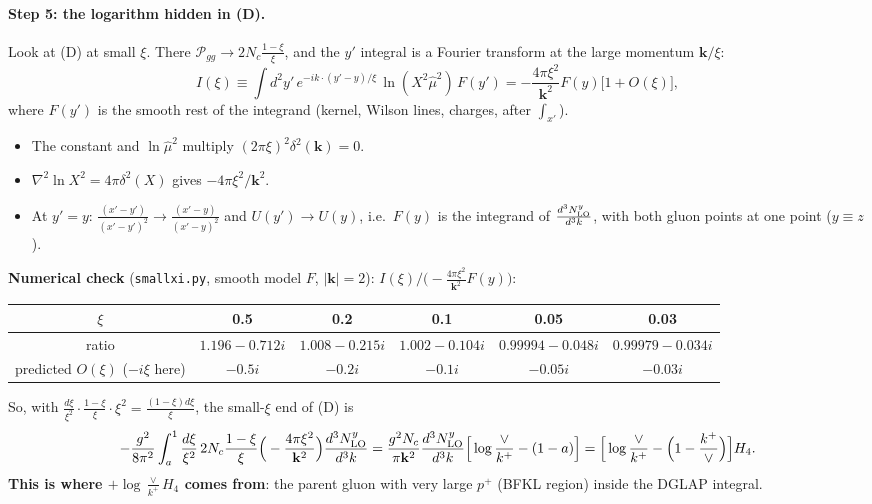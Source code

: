 \documentclass[10pt]{article}
\numberwithin{equation}{section}
\begin{document}
\paragraph{Step 5: the logarithm hidden in (D).}\label{sec:small} Look at (D) at small $\xi$. There $\mathcal P_{gg}\to2N_c\frac{1-\xi}{\xi}$, and the $y'$ integral is a Fourier transform at the large momentum $\mathbf k/\xi$:
\begin{equation}
I(\xi)\equiv\int d^2y'\,e^{-ik\cdot(y'-y)/\xi}\,\ln(X^2\hat\mu^2)\,F(y')=-\frac{4\pi\xi^2}{\mathbf k^2}F(y)\Big[1+O(\xi)\Big],\label{eq:I}
\end{equation}
where $F(y')$ is the smooth rest of the integrand (kernel, Wilson lines, charges, after $\int_{x'}$).
\begin{itemize}
\item The constant and $\ln\hat\mu^2$ multiply $(2\pi\xi)^2\delta^2(\mathbf k)=0$.
\item $\nabla^2\ln X^2=4\pi\delta^2(X)$ gives $-4\pi\xi^2/\mathbf k^2$.
\item At $y'=y$: $\frac{(x'-y')}{(x'-y')^2}\to\frac{(x'-y)}{(x'-y)^2}$ and $U(y')\to U(y)$, i.e.\ $F(y)$ is the integrand of $\frac{d^3N^y_{\rm LO}}{d^3k}$, with both gluon points at one point ($y\equiv z$).
\end{itemize}
\textbf{Numerical check} (\texttt{smallxi.py}, smooth model $F$, $|\mathbf k|=2$): $I(\xi)\big/\big(-\frac{4\pi\xi^2}{\mathbf k^2}F(y)\big)$:
\begin{center}\small
\setlength{\tabcolsep}{3pt}\begin{tabular}{@{}cccccc@{}}\toprule
$\xi$ & 0.5 & 0.2 & 0.1 & 0.05 & 0.03\\\midrule
ratio & $1.196-0.712i$ & $1.008-0.215i$ & $1.002-0.104i$ & $0.99994-0.048i$ & $0.99979-0.034i$\\
predicted $O(\xi)$ ($-i\xi$ here) & $-0.5i$ & $-0.2i$ & $-0.1i$ & $-0.05i$ & $-0.03i$\\\bottomrule
\end{tabular}
\end{center}
So, with $\frac{d\xi}{\xi^2}\cdot\frac{1-\xi}{\xi}\cdot\xi^2=\frac{(1-\xi)d\xi}{\xi}$, the small-$\xi$ end of (D) is
\begin{equation}
-\frac{g^2}{8\pi^2}\int_a^{1}\frac{d\xi}{\xi^2}\,2N_c\frac{1-\xi}{\xi}\Big(-\frac{4\pi\xi^2}{\mathbf k^2}\Big)\frac{d^3N^y_{\rm LO}}{d^3k}=\frac{g^2N_c}{\pi\mathbf k^2}\frac{d^3N^y_{\rm LO}}{d^3k}\Big[\log\frac{\vee}{k^+}-(1-a)\Big]=\Big[\log\frac{\vee}{k^+}-\Big(1-\frac{k^+}{\vee}\Big)\Big]H_4 .\label{eq:hidden}
\end{equation}
\textbf{This is where $+\log\frac{\vee}{k^+}H_4$ comes from}: the parent gluon with very large $p^+$ (BFKL region) inside the DGLAP integral.
\end{document}
